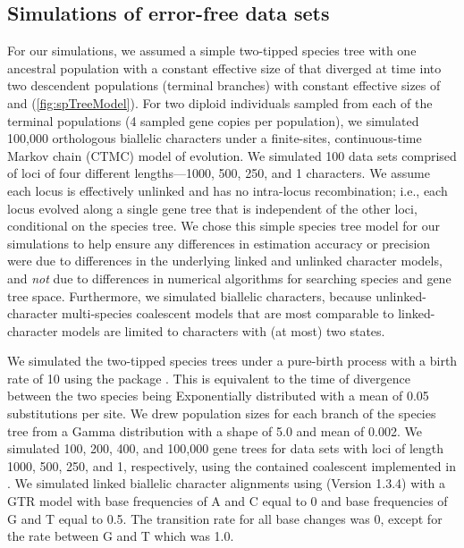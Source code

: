 \subsection{Simulations of error-free data sets}
For our simulations, we assumed a simple two-tipped species tree with one 
ancestral population with a constant effective size of \rootpopsize that 
diverged at time \divtime into two descendent populations (terminal branches) 
with constant effective sizes of \tippopsize[1] and \tippopsize[2] (\cref{fig:spTreeModel}).
For two diploid individuals sampled from each of the terminal
populations (4 sampled gene copies per population),
we simulated 100,000 orthologous biallelic characters under a finite-sites,
continuous-time Markov chain (CTMC) model of evolution.
We simulated 100 data sets comprised of loci of four different lengths---1000,
500, 250, and 1 characters.
We assume each locus is effectively unlinked and has no intra-locus
recombination; i.e., each locus evolved along a single gene tree that is
independent of the other loci, conditional on the species tree.
We chose this simple species tree model for our simulations to help ensure any
differences in estimation accuracy or precision were due to differences in the
underlying linked and unlinked character models,
and \emph{not} due to differences in numerical algorithms for searching species
and gene tree space.
Furthermore, we simulated biallelic characters, because unlinked-character
multi-species coalescent models
\parencite{bryantInferringSpeciesTrees2012,oaksFullBayesianComparative2019}
that are most comparable to linked-character models
\parencite{heledBayesianInferenceSpecies2010,ogilvieStarBEAST2BringsFaster2017}
are limited to characters with (at most) two states.

We simulated the two-tipped species trees under a pure-birth process
\parencite{Yule1925} with a birth rate of 10 using the \python package \dendropy
\parencite[Version 4.40, Commit eb69003;][]{sukumaranDendroPyPythonLibrary2010}.
This is equivalent to the time of divergence between the two species being
Exponentially distributed with a mean of 0.05 substitutions per site.
We drew population sizes for each branch of the species tree from a Gamma 
distribution with a shape of 5.0 and mean of 0.002.
We simulated 100, 200, 400, and 100,000 gene trees for data sets with loci of
length 1000, 500, 250, and 1, respectively, using the contained coalescent
implemented in \dendropy.
We simulated linked biallelic character alignments using
\seqgen (Version 1.3.4)
\parencite{rambautSeqGenApplicationMonte1997}
with a GTR model with base frequencies of A and C equal to 0 and base 
frequencies of G and T equal to 0.5.
The transition rate for all base changes was 0, except for the rate between G
and T which was 1.0. 

